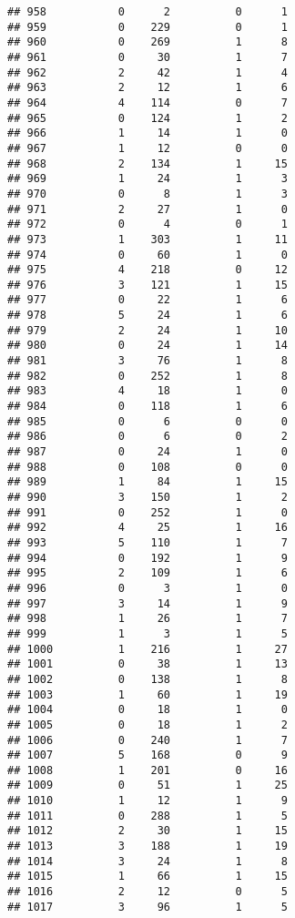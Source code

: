 \documentclass[]{article}
\begin{document}
\begin{verbatim}
## 958           0      2          0      1
## 959           0    229          0      1
## 960           0    269          1      8
## 961           0     30          1      7
## 962           2     42          1      4
## 963           2     12          1      6
## 964           4    114          0      7
## 965           0    124          1      2
## 966           1     14          1      0
## 967           1     12          0      0
## 968           2    134          1     15
## 969           1     24          1      3
## 970           0      8          1      3
## 971           2     27          1      0
## 972           0      4          0      1
## 973           1    303          1     11
## 974           0     60          1      0
## 975           4    218          0     12
## 976           3    121          1     15
## 977           0     22          1      6
## 978           5     24          1      6
## 979           2     24          1     10
## 980           0     24          1     14
## 981           3     76          1      8
## 982           0    252          1      8
## 983           4     18          1      0
## 984           0    118          1      6
## 985           0      6          0      0
## 986           0      6          0      2
## 987           0     24          1      0
## 988           0    108          0      0
## 989           1     84          1     15
## 990           3    150          1      2
## 991           0    252          1      0
## 992           4     25          1     16
## 993           5    110          1      7
## 994           0    192          1      9
## 995           2    109          1      6
## 996           0      3          1      0
## 997           3     14          1      9
## 998           1     26          1      7
## 999           1      3          1      5
## 1000          1    216          1     27
## 1001          0     38          1     13
## 1002          0    138          1      8
## 1003          1     60          1     19
## 1004          0     18          1      0
## 1005          0     18          1      2
## 1006          0    240          1      7
## 1007          5    168          0      9
## 1008          1    201          0     16
## 1009          0     51          1     25
## 1010          1     12          1      9
## 1011          0    288          1      5
## 1012          2     30          1     15
## 1013          3    188          1     19
## 1014          3     24          1      8
## 1015          1     66          1     15
## 1016          2     12          0      5
## 1017          3     96          1      5

\end{verbatim}
\end{document}
